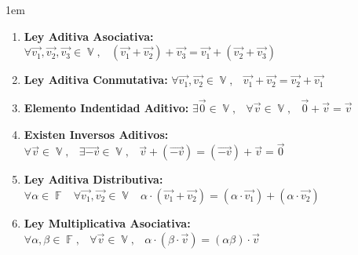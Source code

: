 \documentclass[12pt, fleqn]{report}                             %
\newenvironment{SmallIndentation}[1][0.75em]                    %
        {\begin{adjustwidth}{#1}{}\begin{footnotesize}}             %
        {\end{footnotesize}\end{adjustwidth}}                       %
\DeclareMathOperator \Space     {\quad}                         %
\DeclareMathOperator \MiniSpace {\;}                            %
\theoremstyle{break}                                            %
\DeclareMathOperator \GenericField {\mathbb{F}}                 %
\DeclareMathOperator \VectorSet    {\mathbb{V}}                 %
\begin{document}
                \begin{SmallIndentation}[1em]

                    \begin{enumerate}
                    
                        \item 
                            \textbf{Ley Aditiva Asociativa:}
                            $\forall \vec{v_1}, \vec{v_2}, \vec{v_3} \in \VectorSet, \MiniSpace
                                (\vec{v_1} + \vec{v_2}) + \vec{v_3} = \vec{v_1} + (\vec{v_2} + \vec{v_3})$

                        \item 
                            \textbf{Ley Aditiva Conmutativa:}
                            $\forall \vec{v_1}, \vec{v_2} \in \VectorSet, \MiniSpace
                                    \vec{v_1} + \vec{v_2} = \vec{v_2} + \vec{v_1}$

                        \item 
                            \textbf{Elemento Indentidad Aditivo:}
                            $\exists \vec{0} \in \VectorSet, \MiniSpace
                                \forall \vec{v} \in \VectorSet, \MiniSpace \vec{0} + \vec{v} = \vec{v}$

                        \item 
                            \textbf{Existen Inversos Aditivos:}
                            $\forall \vec{v} \in \VectorSet, \MiniSpace
                                    \exists \vec{-v} \in \VectorSet, \MiniSpace
                                        \vec{v} + (\vec{-v}) = (\vec{-v}) + \vec{v} = \vec{0}$

                        \item 
                            \textbf{Ley Aditiva Distributiva:}
                            $\forall \alpha \in \GenericField \MiniSpace
                                \forall \vec{v_1}, \vec{v_2} \in \VectorSet \MiniSpace
                                    \alpha \cdot (\vec{v_1} + \vec{v_2}) = 
                                        (\alpha \cdot \vec{v_1}) + (\alpha \cdot \vec{v_2})$

                        \item 
                            \textbf{Ley Multiplicativa Asociativa:}
                            $\forall \alpha, \beta \in \GenericField, \MiniSpace
                                \forall \vec{v} \in \VectorSet, \MiniSpace
                                    \alpha \cdot (\beta \cdot \vec{v}) = (\alpha \beta) \cdot \vec{v}$


\end{enumerate}
\end{SmallIndentation}
\end{document}

